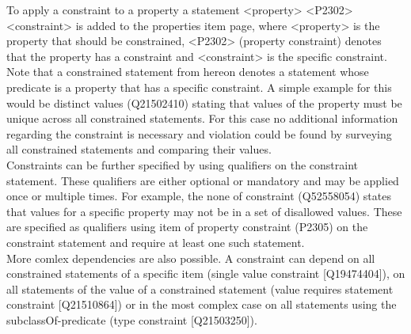 \documentclass[hyperref,bachelorofscience]{cgvpub}
\begin{document}
To apply a constraint to a property a statement <property> <P2302> <constraint> is added to the properties item page, where <property> is the property that should be constrained, <P2302> (property constraint) denotes that the property has a constraint and <constraint> is the specific constraint. Note that a constrained statement from hereon denotes a statement whose predicate is a property that has a specific constraint. A simple example for this would be distinct values (Q21502410) stating that values of the property must be unique across all constrained statements. For this case no additional information regarding the constraint is necessary and violation could be found by surveying all constrained statements and comparing their values.\\
Constraints can be further specified by using qualifiers on the constraint statement. These qualifiers are either optional or mandatory and may be applied once or multiple times. For example, the none of constraint (Q52558054) states that values for a specific property may not be in a set of disallowed values. These are specified as qualifiers using item of property constraint (P2305) on the constraint statement and require at least one such statement.\\
More comlex dependencies are also possible. A constraint can depend on all constrained statements of a specific item (single value constraint [Q19474404]), on all statements of the value of a constrained statement (value requires statement constraint [Q21510864]) or in the most complex case on all statements using the subclassOf-predicate (type constraint [Q21503250]).
\newpage
\end{document}
